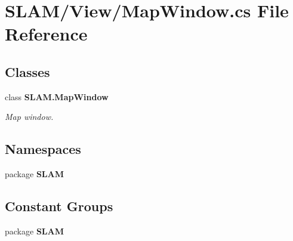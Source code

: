 \section{S\-L\-A\-M/\-View/\-Map\-Window.cs File Reference}
\label{_map_window_8cs}
\subsection*{Classes}
\begin{DoxyCompactItemize}
\item 
class {\bf S\-L\-A\-M.\-Map\-Window}
\begin{DoxyCompactList}\small\item\em Map window. \end{DoxyCompactList}\end{DoxyCompactItemize}
\subsection*{Namespaces}
\begin{DoxyCompactItemize}
\item 
package {\bf S\-L\-A\-M}
\end{DoxyCompactItemize}
\subsection*{Constant Groups}
\begin{DoxyCompactItemize}
\item 
package {\bf S\-L\-A\-M}
\end{DoxyCompactItemize}
